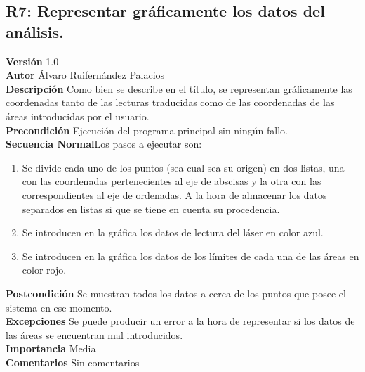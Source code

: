 \subsection{R7: Representar gráficamente los datos del análisis.}
\textbf{Versión} 1.0\\
\textbf{Autor} Álvaro Ruifernández Palacios\\
\textbf{Descripción} Como bien se describe en el título, se representan gráficamente las coordenadas tanto de las lecturas traducidas como de las coordenadas de las áreas introducidas por el usuario.\\
\textbf{Precondición} Ejecución del programa principal sin ningún fallo.\\
\textbf{Secuencia Normal}Los pasos a ejecutar son:
\begin{enumerate}
	\item Se divide cada uno de los puntos (sea cual sea su origen) en dos listas, una con las coordenadas pertenecientes al eje de abscisas y la otra con las correspondientes al eje de ordenadas. A la hora de almacenar los datos separados en listas si que se tiene en cuenta su procedencia.
	\item Se introducen en la gráfica los datos de lectura del láser en color azul.
	\item Se introducen en la gráfica los datos de los límites de cada una de las áreas en color rojo.
\end{enumerate}
\textbf{Postcondición} Se muestran todos los datos a cerca de los puntos que posee el sistema en ese momento.\\
\textbf{Excepciones} Se puede producir un error a la hora de representar si los datos de las áreas se encuentran mal introducidos.\\
\textbf{Importancia} Media\\
\textbf{Comentarios} Sin comentarios\\

